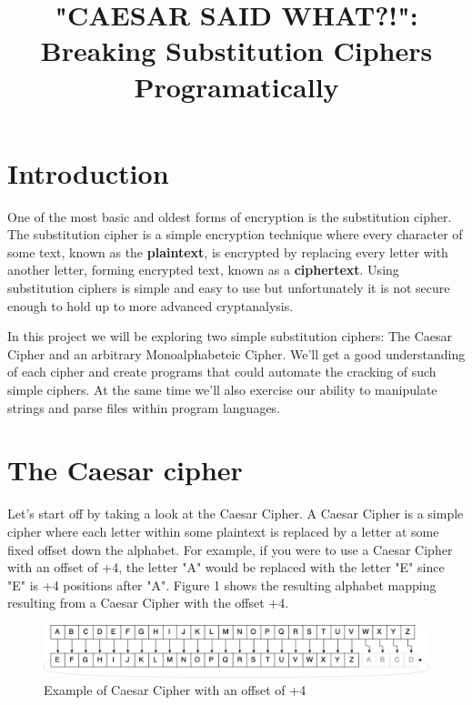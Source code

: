\documentclass{article}
\title{\textbf{"CAESAR SAID WHAT?!":\\ Breaking Substitution Ciphers Programatically}} %
\date{} %
\begin{document}
\maketitle %


\section*{Introduction}

One of the most basic and oldest forms of encryption is the substitution cipher. The substitution cipher is a simple encryption technique where every character of some text, known as the \textbf{plaintext}, is encrypted by replacing every letter with another letter, forming encrypted text, known as a \textbf{ciphertext}. Using substitution ciphers is simple and easy to use but unfortunately it is not secure enough to hold up to more advanced cryptanalysis.

In this project we will be exploring two simple substitution ciphers: The Caesar Cipher and an arbitrary Monoalphabeteic Cipher. We'll get a good understanding of each cipher and create programs that could automate the cracking of such simple ciphers. At the same time we'll also exercise our ability to manipulate strings and parse files within program languages.

\section{The Caesar cipher}
Let's start off by taking a look at the Caesar Cipher. A Caesar Cipher is a simple cipher where each letter within some plaintext is replaced by a letter at some fixed offset down the alphabet. For example, if you were to use a Caesar Cipher with an offset of +4, the letter "A" would be replaced with the letter "E" since "E" is +4 positions after "A". Figure 1 shows the resulting alphabet mapping resulting from a Caesar Cipher with the offset +4.\\


\begin{figure}[h!]
 \centering
  \includegraphics[width=1\textwidth]{caesarcipher}
 \caption{Example of Caesar Cipher with an offset of +4}
 \end{figure}
\end{document}
